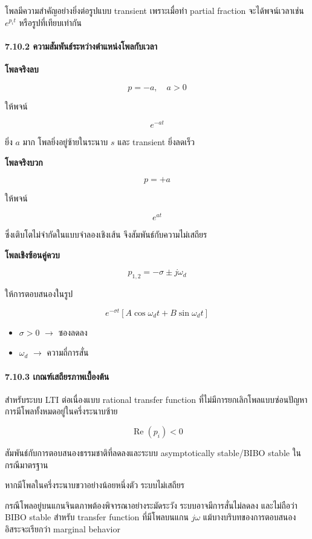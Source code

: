 โพลมีความสำคัญอย่างยิ่งต่อรูปแบบ transient เพราะเมื่อทำ partial fraction จะได้พจน์เวลาเช่น $e^{p_it}$ หรือรูปที่เทียบเท่ากัน

\paragraph{7.10.2 ความสัมพันธ์ระหว่างตำแหน่งโพลกับเวลา}

\textbf{โพลจริงลบ}

\[
p=-a,\quad a>0
\]

ให้พจน์

\[
e^{-at}
\]

ยิ่ง $a$ มาก โพลยิ่งอยู่ซ้ายในระนาบ $s$ และ transient ยิ่งลดเร็ว

\textbf{โพลจริงบวก}

\[
p=+a
\]

ให้พจน์

\[
e^{at}
\]

ซึ่งเติบโตไม่จำกัดในแบบจำลองเชิงเส้น จึงสัมพันธ์กับความไม่เสถียร

\textbf{โพลเชิงซ้อนคู่ควบ}

\[
p_{1,2}=-\sigma\pm j\omega_d
\]

ให้การตอบสนองในรูป

\[
e^{-\sigma t}[A\cos\omega_dt+B\sin\omega_dt]
\]

\begin{itemize}
    \item $\sigma>0$ $\to$ ซองลดลง
    \item $\omega_d$ $\to$ ความถี่การสั่น
\end{itemize}

\paragraph{7.10.3 เกณฑ์เสถียรภาพเบื้องต้น}

สำหรับระบบ LTI ต่อเนื่องแบบ rational transfer function ที่ไม่มีการยกเลิกโพลแบบซ่อนปัญหา การมีโพลทั้งหมดอยู่ในครึ่งระนาบซ้าย

\[
\operatorname{Re}(p_i)<0
\]

สัมพันธ์กับการตอบสนองธรรมชาติที่ลดลงและระบบ asymptotically stable/BIBO stable ในกรณีมาตรฐาน

หากมีโพลในครึ่งระนาบขวาอย่างน้อยหนึ่งตัว ระบบไม่เสถียร

กรณีโพลอยู่บนแกนจินตภาพต้องพิจารณาอย่างระมัดระวัง ระบบอาจมีการสั่นไม่ลดลง และไม่ถือว่า BIBO stable สำหรับ transfer function ที่มีโพลบนแกน $j\omega$ แม้บางบริบทของการตอบสนองอิสระจะเรียกว่า marginal behavior

